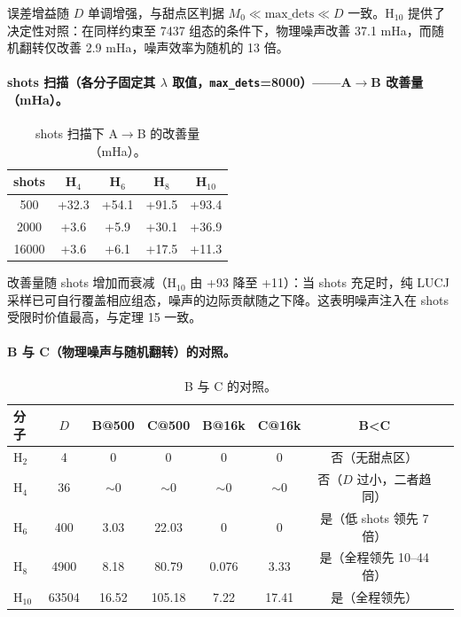 \documentclass[UTF8,12pt,a4paper]{ctexart}
\newcommand{\Htwo}{H$_2$}
\begin{document}
误差增益随 $D$ 单调增强，与甜点区判据 $M_0\ll\text{max\_dets}\ll D$ 一致。H$_{10}$ 提供了决定性对照：在同样约束至 7437 组态的条件下，物理噪声改善 37.1 mHa，而随机翻转仅改善 2.9 mHa，噪声效率为随机的 13 倍。

\paragraph{shots 扫描（各分子固定其 $\lambda$ 取值，\texttt{max\_dets}=8000）——A$\rightarrow$B 改善量（mHa）。}

\begin{table}[H]
\centering
\caption{shots 扫描下 A$\rightarrow$B 的改善量（mHa）。}
\begin{tabular}{ccccc}
\toprule
shots & H$_4$ & H$_6$ & H$_8$ & H$_{10}$ \\
\midrule
500 & +32.3 & +54.1 & +91.5 & +93.4 \\
2000 & +3.6 & +5.9 & +30.1 & +36.9 \\
16000 & +3.6 & +6.1 & +17.5 & +11.3 \\
\bottomrule
\end{tabular}
\end{table}

改善量随 shots 增加而衰减（H$_{10}$ 由 +93 降至 +11）：当 shots 充足时，纯 LUCJ 采样已可自行覆盖相应组态，噪声的边际贡献随之下降。这表明噪声注入在 shots 受限时价值最高，与定理 15 一致。

\paragraph{B 与 C（物理噪声与随机翻转）的对照。}

\begin{table}[H]
\centering
\caption{B 与 C 的对照。}
\begin{tabular}{lccccccl}
\toprule
分子 & $D$ & B@500 & C@500 & B@16k & C@16k & B<C \\
\midrule
\Htwo{} & 4 & 0 & 0 & 0 & 0 & 否（无甜点区） \\
H$_4$ & 36 & $\sim$0 & $\sim$0 & $\sim$0 & $\sim$0 & 否（$D$ 过小，二者趋同） \\
H$_6$ & 400 & 3.03 & 22.03 & 0 & 0 & 是（低 shots 领先 7 倍） \\
H$_8$ & 4900 & 8.18 & 80.79 & 0.076 & 3.33 & 是（全程领先 10--44 倍） \\
H$_{10}$ & 63504 & 16.52 & 105.18 & 7.22 & 17.41 & 是（全程领先） \\
\bottomrule
\end{tabular}
\end{table}
\end{document}
